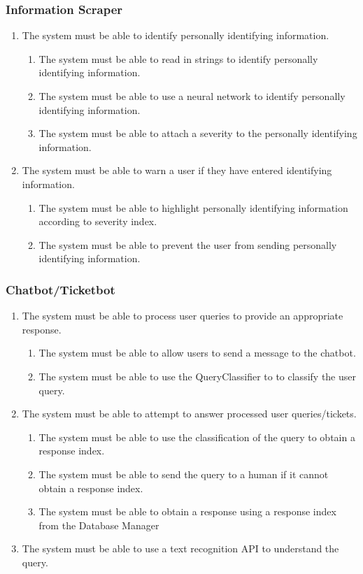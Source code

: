 \documentclass[11pt]{article}
\begin{document}
\subsubsection{Information Scraper}
\begin{enumerate}[label=R2.\arabic*.]
	\item The system must be able to identify personally identifying information.
	\begin{enumerate}[label*=\arabic*.]
		\item The system must be able to read in strings to identify personally identifying information.
		\item The system must be able to use a neural network to identify personally identifying information.
		\item The system must be able to attach a severity to the personally identifying information.
	\end{enumerate}
	\item The system must be able to warn a user if they have entered identifying information.
	\begin{enumerate}[label*=\arabic*.]
		\item The system must be able to highlight personally identifying information according to severity index.
		\item The system must be able to prevent the user from sending personally identifying information.
	\end{enumerate}
\end{enumerate}

\subsubsection{Chatbot/Ticketbot}
\begin{enumerate}[label=R3.\arabic*.]
	\item The system must be able to process user queries to provide an appropriate response.
	\begin{enumerate}[label*=\arabic*.]
		\item The system must be able to allow users to send a message to the chatbot.
		\item The system must be able to use the QueryClassifier to to classify the user query.
	\end{enumerate}
	\item The system must be able to attempt to answer processed user queries/tickets.
	      \begin{enumerate}[label*=\arabic*.]
	      	\item The system must be able to use the classification of the query to obtain a response index.
		\item The system must be able to send the query to a human if it cannot obtain a response index.
		\item The system must be able to obtain a response using a response index from the Database Manager
	      \end{enumerate}
	\item The system must be able to use a text recognition API to understand the query.
\end{enumerate}
\end{document}
